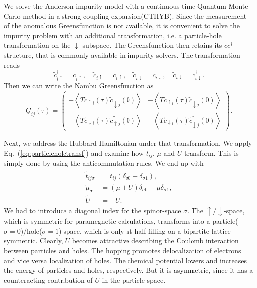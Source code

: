 \documentclass[aps,prb,twocolumn,groupedaddress,amsmath,amssymb]{revtex4-1}
\newcommand{\up}{\uparrow}
\newcommand{\dn}{\downarrow}
\newcommand{\refeq}[1]{Eq.~(\ref{#1})}
\newcommand{\expectv}[1]{\left< #1 \right>}
\newcommand{\Nambu}[1]{\underline{#1}}
\begin{document}
We solve the Anderson impurity model with a continuous time Quantum Monte-Carlo method in a strong coupling expansion(CTHYB).\cite{Parcollet2015,Seth2016} Since the measurement of the anomalous Greensfunction is not available, it is convenient to solve the impurity problem with an additional transformation, i.e. a particle-hole transformation on the $\dn$-subspace. The Greensfunction then retains its $cc^\dagger$-structure, that is commonly available in impurity solvers. The transformation reads
\begin{equation}
  \label{eq:particleholetransf}
  \tilde{c}^\dagger_{i\up}=c^\dagger_{i\up},\quad \tilde{c}_{i\up}=c_{i\up},\quad\tilde{c}^\dagger_{i\dn}=c_{i\dn},\quad \tilde{c}_{i\dn}=c^\dagger_{i\dn}.
\end{equation}
Then we can write the Nambu Greensfunction as
\begin{equation}
  \label{eq:nambugfph}
  \Nambu{G}_{ij}(\tau)=\begin{pmatrix}-\expectv{T\tilde{c}_{\up i}(\tau)\tilde{c}^\dagger_{\dn j}(0)}&-\expectv{T\tilde{c}_{\up i}(\tau)\tilde{c}^\dagger_{\dn j}(0)}\\-\expectv{T\tilde{c}_{\dn i}(\tau)\tilde{c}^\dagger_{\up j}(0)}&-\expectv{T\tilde{c}_{\dn i}(\tau)\tilde{c}^\dagger_{\dn j}(0)}\end{pmatrix}.
\end{equation}

Next, we address the Hubbard-Hamiltonian under that transformation. We apply \refeq{eq:particleholetransf} and examine how $t_{ij}$, $\mu$ and $U$ transform. This is simply done by using the anticommutation rules. We end up with
\begin{align}
  \label{eq:nambuhubbard}
  \begin{split}
    \tilde{t}_{ij\sigma}&=t_{ij}\left(\delta_{\sigma 0}-\delta_{\sigma 1}\right),\\
    \tilde{\mu}_\sigma&=\left(\mu+U\right)\delta_{\sigma 0}-\mu\delta_{\sigma 1},\\
    \tilde{U}&=-U.
  \end{split}
\end{align}
We had to introduce a diagonal index for the spinor-space $\sigma$. The $\up /\dn$-space, which is symmetric for paramegnetic calculations, transforms into a particle($\sigma=0$)/hole($\sigma=1$) space, which is only at half-filling on a bipartite lattice symmetric. Clearly, $U$ becomes attractive describing the Coulomb interaction between particles and holes. The hopping promotes delocalization of electrons and vice versa localization of holes. The chemical potential lowers and increases the energy of particles and holes, respectively. But it is asymmetric, since it has a counteracting contribution of $U$ in the particle space.
\end{document}
